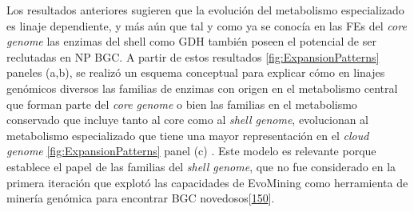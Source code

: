 \documentclass[12pt,twoside]{reedthesis}
\begin{document}
  Los resultados anteriores sugieren que la evolución del metabolismo
  especializado es linaje dependiente, y más aún que tal y como ya se
  conocía en las FEs del \emph{core genome} las enzimas del shell como GDH
  también poseen el potencial de ser reclutadas en NP BGC. A partir de
  estos resultados \autoref{fig:ExpansionPatterns} paneles (a,b), se
  realizó un esquema conceptual para explicar cómo en linajes genómicos
  diversos las familias de enzimas con origen en el metabolismo central
  que forman parte del \emph{core genome} o bien las familias en el
  metabolismo conservado que incluye tanto al core como al \emph{shell
  genome}, evolucionan al metabolismo especializado que tiene una mayor
  representación en el \emph{cloud genome} \autoref{fig:ExpansionPatterns}
  panel (c) . Este modelo es relevante porque establece el papel de las
  familias del \emph{shell genome}, que no fue considerado en la primera
  iteración que explotó las capacidades de EvoMining como herramienta de
  minería genómica para encontrar BGC
  novedosos{[}\protect\hyperlink{ref-navarro-munoz_computational_2018}{150}{]}.
  
\end{document}
